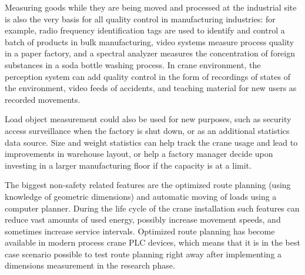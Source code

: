 \documentclass[12pt,a4paper,oneside,pdftex]{report}
\begin{document}
Measuring goods while they are being moved and processed at the industrial site is also the very basis for all quality control in manufacturing industries: for example, radio frequency identification tags are used to identify and control a batch of products in bulk manufacturing, video systems measure process quality in a paper factory, and a spectral analyzer measures the concentration of foreign substances in a soda bottle washing process. In crane environment, the perception system can add quality control in the form of recordings of states of the environment, video feeds of accidents, and teaching material for new users as recorded movements. 

Load object measurement could also be used for new purposes, such as security access surveillance when the factory is shut down, or as an additional statistics data source. Size and weight statistics can help track the crane usage and lead to improvements in warehouse layout, or help a factory manager decide upon investing in a larger manufacturing floor if the capacity is at a limit.

 The biggest non-safety related features are the optimized route planning (using knowledge of geometric dimensions) and automatic moving of loads using a computer planner. During the life cycle of the crane installation such features can reduce vast amounts of used energy, possibly increase movement speeds, and sometimes increase service intervals. Optimized route planning has become available in modern process crane PLC devices, which means that it is in the best case scenario possible to test route planning right away after implementing a dimensions measurement in the research phase.
\end{document}
